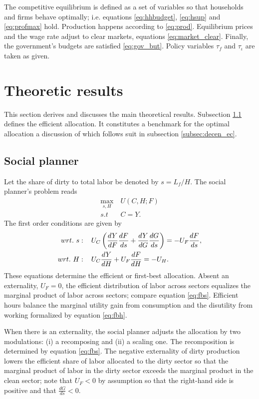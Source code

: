The competitive equilibrium is defined as a set of variables so that households and firms behave optimally; i.e. equations \ref{eq:hhbudget}, \ref{eq:hsup} and \ref{eq:profmax} hold. Production happens according to \ref{eq:prod}.  Equilibrium prices and the wage rate adjust to clear markets, equations \ref{eq:market_clear}. Finally, the government's budgets are satisfied \ref{eq:gov_but}. Policy variables $\tau_f$ and $\tau_\iota$ are taken as given. 

\section{Theoretic results}
This section derives and discusses the main theoretical results. Subsection \ref{subsec:sp} defines the efficient allocation. It constitutes a benchmark for the optimal allocation a discussion of which follows suit in subsection \ref{subsec:decen_ec}. 
\subsection{Social planner}\label{subsec:sp}
Let the share of dirty to total labor be denoted by $s=L_f/H$. The social planner's problem reads
\begin{align}
\underset{s, H}{\max}\ & U(C,H; F)\\ s.t\ \ & C=Y.
\end{align}
The first order conditions are given by
\begin{align}
wrt.\ s:\hspace{4mm} & U_C\left(\frac{dY}{dF}\frac{dF}{ds}+\frac{dY}{dG}\frac{dG}{ds}\right)=-U_F\frac{dF}{ds}, \label{eq:fbs}
\\
wrt.\ H:\hspace{4mm} & U_C\frac{dY}{dH}+U_F\frac{dF}{dH}=-U_H\label{eq:fbh}. 
\end{align}
These equations determine the efficient or first-best allocation. 
Absent an externality, $U_F=0$, the efficient distribution of labor across sectors equalizes the marginal product of labor across sectors; compare equation \ref{eq:fbs}. Efficient hours balance the marginal utility gain from consumption and the disutility from working formalized by equation \ref{eq:fbh}. 

When there is an externality, the social planner adjusts the allocation by two modulations: (i) a recomposing and (ii) a scaling one. 
The recomposition is determined by equation \ref{eq:fbs}.
The negative externality of dirty production  lowers the efficient share of labor allocated to  the dirty sector so that the marginal product of labor in the dirty sector exceeds the marginal product in the clean sector; note that $U_F<0$ by assumption so that the right-hand side is positive and that $\frac{dG}{ds}<0$.
\begin{comment}
The equation 
\begin{align}
\frac{-U_F}{U_C \frac{dY}{dF}}=1+\frac{\frac{dY}{dG}\frac{dG}{ds}}{\frac{dY}{dF}\frac{dF}{ds}}.
\end{align}
The term on the left-hand side is the social cost of the externality: it measures what the representative household is willing to pay for a further reduction in dirty production. 
\end{comment}

